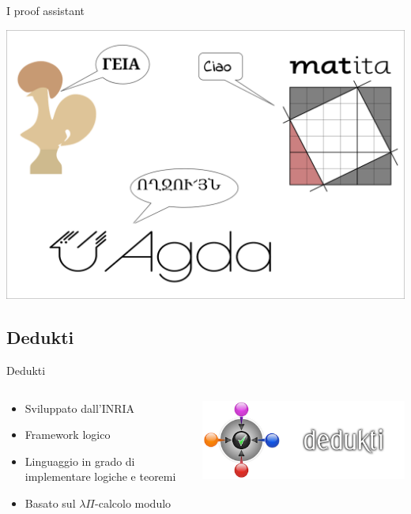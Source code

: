 \documentclass{beamer}
\begin{document}
\begin{frame}{I proof assistant}
  \begin{center}
    \includegraphics[scale=0.25]{inter.png}
  \end{center}
\end{frame}

\subsection{Dedukti}
\begin{frame}{Dedukti}
\begin{columns}

\begin{column}{.5\textwidth}
\begin{itemize}
  \item Sviluppato dall'INRIA
  \vspace{1.5em}
  \item Framework logico
  \vspace{1.5em}
  \item Linguaggio in grado di implementare logiche e teoremi
  \vspace{1.5em}
  \item Basato sul $\lambda\Pi$-calcolo modulo
\end{itemize}
\end{column}

\begin{column}{.5\textwidth}
\includegraphics[scale=1]{dedukti2.png}
\end{column}
\end{columns}
\end{frame}
\end{document}
